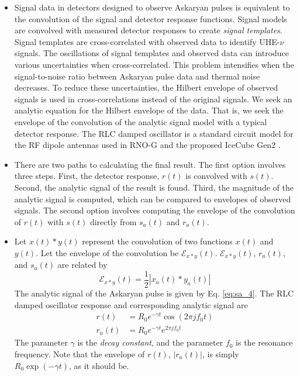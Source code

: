 \documentclass[amsmath,amssymb,aps,prd,10pt,twocolumn,showkeys]{revtex4}
\begin{document}
\begin{itemize}
\item Signal data in detectors designed to observe Askaryan pulses is equivalent to the convolution of the signal and detector response functions.  Signal models are convolved with measured detector responses to create \textit{signal templates}.  Signal templates are cross-correlated with observed data to identify UHE-$\nu$ signals.  The oscillations of signal templates and observed data can introduce various uncertainties when cross-correlated.  This problem intensifies when the signal-to-noise ratio between Askaryan pulse data and thermal noise decreases.  To reduce these uncertainties, the Hilbert envelope of observed signals is used in cross-correlations instead of the original signals.  We seek an analytic equation for the Hilbert envelope of the data.  That is, we seek the envelope of the convolution of the analytic signal model with a typical detector response.  The RLC damped oscillator is a standard circuit model for the RF dipole antennas used in RNO-G and the proposed IceCube Gen2 \cite{10.1103/PhysRevD.85.062004,10.1088/1748-0221/16/03/p03025,10.48550/arxiv.2008.04323}.
\item There are two paths to calculating the final result.  The first option involves three steps.  First, the detector response, $r(t)$ is convolved with $s(t)$.  Second, the analytic signal of the result is found.  Third, the magnitude of the analytic signal is computed, which can be compared to envelopes of observed signals.  The second option involves computing the envelope of the convolution of $r(t)$ with $s(t)$ directly from $s_a(t)$ and $r_a(t)$.
\item Let $x(t) * y(t)$ represent the convolution of two functions $x(t)$ and $y(t)$.  Let the envelope of the convolution be $\mathcal{E}_{x * y}(t)$.  $\mathcal{E}_{x * y}(t)$, $r_a(t)$, and $s_a(t)$ are related by
\begin{equation}
\mathcal{E}_{x * y}(t) = \frac{1}{2}| x_a (t) * y_a(t)| \label{eq:awesome}
\end{equation}
The analytic signal of the Askaryan pulse is given by Eq. \ref{eq:sa_4}.  The RLC damped oscillator response and corresponding analytic signal are
\begin{align}
r(t) &= R_0 e^{-\gamma t} \cos(2\pi j f_0 t) \\
r_a(t) &= R_0 e^{-\gamma t} e^{2\pi j f_0 t}
\end{align}
The parameter $\gamma$ is the \textit{decay constant}, and the parameter $f_0$ is the resonance frequency.  Note that the envelope of $r(t)$, $|r_a(t)|$, is simply $R_0 \exp(-\gamma t)$, as it should be.

\end{itemize}
\end{document}
